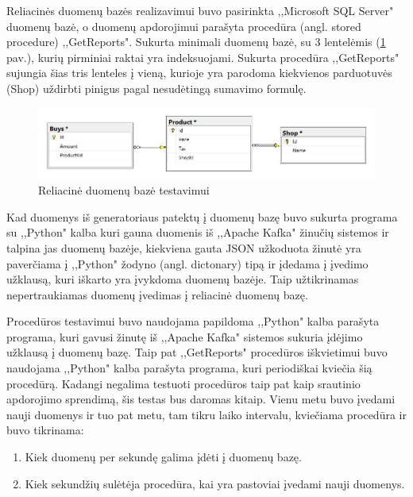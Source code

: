\documentclass{VUMIFPSkursinis}
\begin{document}
Reliacinės duomenų bazės realizavimui buvo pasirinkta ,,Microsoft SQL Server" duomenų bazė, o duomenų apdorojimui parašyta procedūra (angl. stored procedure) ,,GetReports".
Sukurta minimali duomenų bazė, su 3 lentelėmis (\ref{fig:dbdiagram} pav.), kurių pirminiai raktai yra indeksuojami. Sukurta procedūra ,,GetReports" sujungia šias tris lenteles į vieną, kurioje yra parodoma kiekvienos 
parduotuvės (Shop) uždirbti pinigus pagal nesudėtingą sumavimo formulę.
\begin{figure}[!htbp]
    \centering
    \includegraphics[width=1\textwidth]{img/dbdiagram.jpg}
    \caption{Reliacinė duomenų bazė testavimui}
    \label{fig:dbdiagram}
\end{figure}
Kad duomenys iš generatoriaus patektų į duomenų bazę buvo sukurta programa su ,,Python" kalba kuri gauna duomenis iš ,,Apache Kafka" žinučių sistemos ir talpina jas
duomenų bazėje, kiekviena gauta JSON užkoduota žinutė yra paverčiama į ,,Python" žodyno (angl. dictonary) tipą ir įdedama į įvedimo užklausą, kuri iškarto yra 
įvykdoma duomenų bazėje. Taip užtikrinamas nepertraukiamas duomenų įvedimas į reliacinė duomenų bazę.\par
Procedūros testavimui buvo naudojama papildoma ,,Python" kalba parašyta programa, kuri gavusi žinutę iš ,,Apache Kafka" sistemos sukuria įdėjimo užklausą į duomenų bazę.
Taip pat ,,GetReports" procedūros iškvietimui buvo naudojama ,,Python" kalba parašyta programa, kuri periodiškai kviečia šią procedūrą. 
Kadangi negalima testuoti procedūros taip pat kaip srautinio apdorojimo sprendimą, šis testas bus daromas kitaip.
Vienu metu buvo įvedami nauji duomenys ir tuo pat metu, tam tikru laiko intervalu, kviečiama procedūra ir buvo tikrinama:
    \begin{enumerate}
        \item Kiek duomenų per sekundę galima įdėti į duomenų bazę.
        \item Kiek sekundžių sulėtėja procedūra, kai yra pastoviai įvedami nauji duomenys.
    \end{enumerate}
\end{document}
